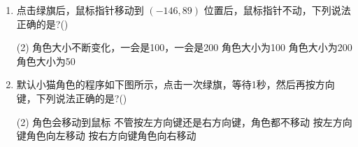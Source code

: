 \documentclass[10pt, a4paper]{article}
\begin{document}
\begin{enumerate}
        \item 点击绿旗后，鼠标指针移动到 $(-146,89)$ 位置后，鼠标指针不动，下列说法正确的是?(\qquad)
        \begin{tasks}(2)
            \task 角色大小不断变化，一会是100，一会是200
            \task 角色大小为100
            \task 角色大小为200
            \task 角色大小为50
        \end{tasks}

        \item 默认小猫角色的程序如下图所示，点击一次绿旗，等待1秒，然后再按方向键，下列说法正确的是?(\qquad)
        \begin{tasks}(2)
            \task 角色会移动到鼠标
            \task 不管按左方向键还是右方向键，角色都不移动
            \task 按左方向键角色向左移动
            \task 按右方向键角色向右移动
        \end{tasks}


\end{enumerate}
\end{document}
